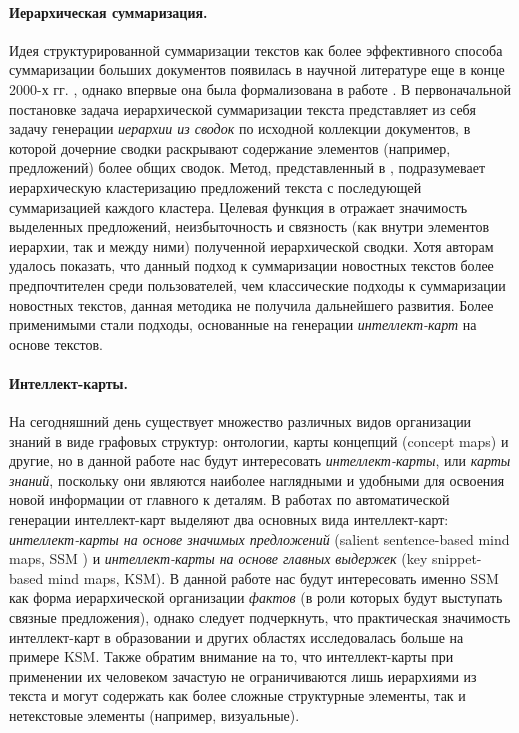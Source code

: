 \documentclass[12pt]{article}
\begin{document}
\paragraph{Иерархическая суммаризация.} Идея структурированной суммаризации текстов как более эффективного способа суммаризации больших документов появилась в научной литературе еще в конце 2000-х гг. \cite{yang2008hierarchical}, однако впервые она была формализована в работе \cite{christensen2014hierarchical}. В первоначальной постановке задача иерархической суммаризации текста представляет из себя задачу генерации \textit{иерархии из сводок} по исходной коллекции документов, в которой дочерние сводки раскрывают содержание элементов (например, предложений) более общих сводок. Метод, представленный в \cite{christensen2014hierarchical}, подразумевает иерархическую кластеризацию предложений текста с последующей суммаризацией каждого кластера. Целевая функция в \cite{christensen2014hierarchical} отражает значимость выделенных предложений, неизбыточность и связность (как внутри элементов иерархии, так и между ними) полученной иерархической сводки. Хотя авторам удалось показать, что данный подход к суммаризации новостных текстов более предпочтителен среди пользователей, чем классические подходы к суммаризации новостных текстов, данная методика не получила дальнейшего развития. Более применимыми стали подходы, основанные на генерации \textit{интеллект-карт} на основе текстов.

\paragraph{Интеллект-карты.} На сегодняшний день существует множество различных видов организации знаний в виде графовых структур: онтологии, карты концепций (concept maps) и другие, но в данной работе нас будут интересовать \textit{интеллект-карты}, или \textit{карты знаний}, поскольку они являются наиболее наглядными и удобными для освоения новой информации от главного к деталям. В работах по автоматической генерации интеллект-карт выделяют два основных вида интеллект-карт: \textit{интеллект-карты на основе значимых предложений} (salient sentence-based mind maps, SSM \cite{wei2019revealing}) и \textit{интеллект-карты на основе главных выдержек} (key snippet-based mind maps, KSM\cite{wei2019revealing}). В данной работе нас будут интересовать именно SSM как форма иерархической организации \textit{фактов} (в роли которых будут выступать связные предложения), однако следует подчеркнуть, что практическая значимость интеллект-карт в образовании и других областях исследовалась больше на примере KSM. Также обратим внимание на то, что интеллект-карты при применении их человеком зачастую не ограничиваются лишь иерархиями из текста и могут содержать как более сложные структурные элементы, так и нетекстовые элементы (например, визуальные).
\end{document}
